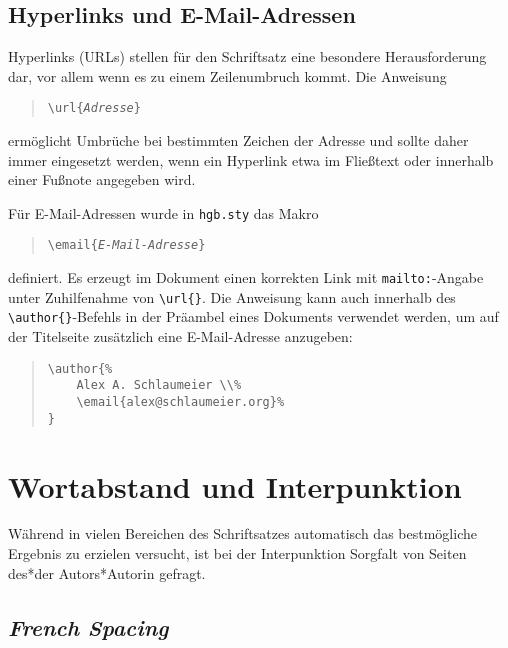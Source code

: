 \subsection{Hyperlinks und E-Mail-Adressen}

Hyperlinks (URLs) stellen für den Schriftsatz eine besondere Herausforderung
dar, vor allem wenn es zu einem Zeilenumbruch kommt. Die Anweisung
%
\begin{quote}
    \verb!\url{!\texttt{\em Adresse}\verb!}!
\end{quote}
%
ermöglicht Umbrüche bei bestimmten Zeichen der Adresse und sollte daher immer
eingesetzt werden, wenn ein Hyperlink etwa im Fließtext oder innerhalb einer
Fußnote angegeben wird.

Für E-Mail-Adressen wurde in \texttt{hgb.sty} das Makro
%
\begin{quote}
    \verb!\email{!\texttt{\em E-Mail-Adresse}\verb!}!
\end{quote}
%
definiert. Es erzeugt im Dokument einen korrekten Link mit
\texttt{mailto:}-Angabe unter Zuhilfenahme von \verb|\url{}|. Die Anweisung
kann auch innerhalb des \verb|\author{}|-Befehls in der Präambel eines
Dokuments verwendet werden, um auf der Titelseite zusätzlich eine
E-Mail-Adresse anzugeben:
%
\begin{quote}
    \begin{verbatim}
\author{%
    Alex A. Schlaumeier \\%
    \email{alex@schlaumeier.org}%
}
    \end{verbatim}
\end{quote}
%


\section{Wortabstand und Interpunktion}

Während \latex in vielen Bereichen des Schriftsatzes automatisch das
bestmögliche Ergebnis zu erzielen versucht, ist bei der Interpunktion
Sorgfalt von Seiten des*der Autors*Autorin gefragt.

\subsection{\emph{French Spacing}}

